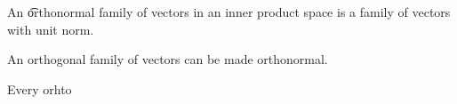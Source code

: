 


An \t{orthonormal family of vectors} in an inner product space is a family of vectors with unit norm.

\begin{prop}
  An orthogonal family of vectors can be made orthonormal.
\end{prop}

\begin{prop}
  Every orhto
\end{prop}
